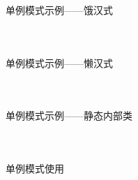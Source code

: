 \documentclass[UTF8,aspectratio=169]{beamer}
\begin{document}
\begin{frame}{单例模式示例——饿汉式}
    \begin{columns}
        \begin{column}{0.48\textwidth}
            \inputminted[firstline=7, lastline=22]{cpp}{code/singleton_pattern.cpp}
        \end{column}
        \begin{column}{0.48\textwidth}
            \inputminted[firstline=23, lastline=38]{cpp}{code/singleton_pattern.cpp}
        \end{column}
    \end{columns}
\end{frame}

\begin{frame}{单例模式示例——懒汉式}
    \begin{columns}
        \begin{column}{0.48\textwidth}
            \inputminted[firstline=40, lastline=59]{cpp}{code/singleton_pattern.cpp}
        \end{column}
        \begin{column}{0.48\textwidth}
            \inputminted[firstline=60, lastline=78]{cpp}{code/singleton_pattern.cpp}
        \end{column}
    \end{columns}
\end{frame}

\begin{frame}{单例模式示例——静态内部类}
    \begin{columns}
        \begin{column}{0.48\textwidth}
            \inputminted[firstline=80, lastline=96]{cpp}{code/singleton_pattern.cpp}
        \end{column}
        \begin{column}{0.48\textwidth}
            \inputminted[firstline=97, lastline=112]{cpp}{code/singleton_pattern.cpp}
        \end{column}
    \end{columns}
\end{frame}

\begin{frame}{单例模式使用}
    \begin{columns}
        \begin{column}{0.48\textwidth}
            \inputminted[firstline=120, lastline=135]{cpp}{code/singleton_pattern.cpp}
        \end{column}
        \begin{column}{0.48\textwidth}
            \inputminted[firstline=136, lastline=152]{cpp}{code/singleton_pattern.cpp}
        \end{column}
    \end{columns}
\end{frame}
\end{document}
